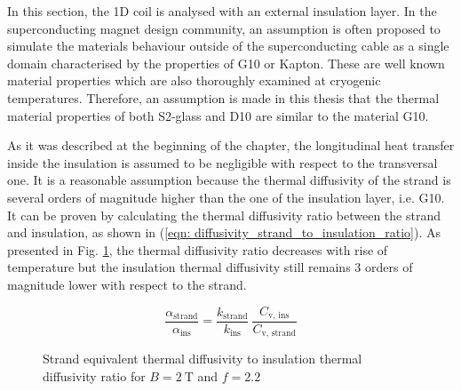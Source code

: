 
In this section, the 1D coil is analysed with an external insulation layer. In the superconducting magnet design community, an assumption is often proposed to simulate the materials behaviour outside of the superconducting cable as a single domain characterised by the properties of G10 or Kapton. These are well known material properties which are also thoroughly examined at cryogenic temperatures. Therefore, an assumption is made in this thesis that the thermal material properties of both S2-glass and D10 are similar to the material G10.

As it was described at the beginning of the chapter, the longitudinal heat transfer inside the insulation is assumed to be negligible with respect to the transversal one. It is a reasonable assumption because the thermal diffusivity of the strand is several orders of magnitude higher than the one of the insulation layer, i.e. G10. It can be proven by calculating the thermal diffusivity ratio between the strand and insulation, as shown in (\ref{eqn: diffusivity_strand_to_insulation_ratio}). As presented in Fig. \ref{fig:diffusivity_strand_to_insulation_ratio}, the thermal diffusivity ratio decreases with rise of temperature but the insulation thermal diffusivity still remains 3 orders of magnitude lower with respect to the strand.

\begin{equation}
    \frac{\alpha_\text{strand}}{\alpha_\text{ins}} = \frac{k_\text{strand}}{k_\text{ins}}~\frac{C_\text{v, ins}}{C_\text{v, strand}}
    \label{eqn: diffusivity_strand_to_insulation_ratio}
\end{equation}

\begin{figure}[h!]
\centering
    \caption{Strand equivalent thermal diffusivity to insulation thermal diffusivity ratio for $B=2~\text{T}$ and $f=2.2$}
    \label{fig:diffusivity_strand_to_insulation_ratio}
\end{figure}

